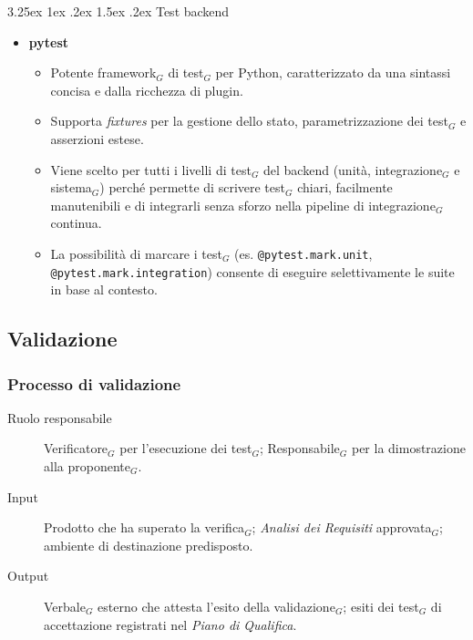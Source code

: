 \documentclass[a4paper, 10pt]{article}
\makeatletter
\renewcommand\paragraph{\@startsection{paragraph}{4}{\z@}%
  {3.25ex \@plus1ex \@minus .2ex}%
  {1.5ex \@plus .2ex}%
  {\normalfont\normalsize\bfseries}}
\makeatother
\begin{document}
\paragraph{Test backend}
\begin{itemize}
    \item \textbf{pytest}
    \begin{itemize}
        \item Potente framework$_G$ di test$_G$ per Python, caratterizzato da una sintassi concisa e dalla ricchezza di plugin.
        \item Supporta \emph{fixtures} per la gestione dello stato, parametrizzazione dei test$_G$ e asserzioni estese.
        \item Viene scelto per tutti i livelli di test$_G$ del backend (unità, integrazione$_G$ e sistema$_G$) perché permette di scrivere test$_G$ chiari, facilmente manutenibili e di integrarli senza sforzo nella pipeline di integrazione$_G$ continua.
        \item La possibilità di marcare i test$_G$ (es. \texttt{@pytest.mark.unit}, \texttt{@pytest.mark.integration}) consente di eseguire selettivamente le suite in base al contesto.
    \end{itemize}
\end{itemize}

\subsection{Validazione}
\label{subsec:validazione}

\subsubsection{Processo di validazione}

\begin{description}
    \item[Ruolo responsabile] Verificatore$_G$ per l'esecuzione dei test$_G$; Responsabile$_G$ per la dimostrazione alla proponente$_G$.
    \item[Input] Prodotto che ha superato la verifica$_G$; \emph{Analisi dei Requisiti} approvata$_G$; ambiente di destinazione predisposto.
    \item[Output] Verbale$_G$ esterno che attesta l'esito della validazione$_G$; esiti dei test$_G$ di accettazione registrati nel \emph{Piano di Qualifica}.
\end{description}
\end{document}
